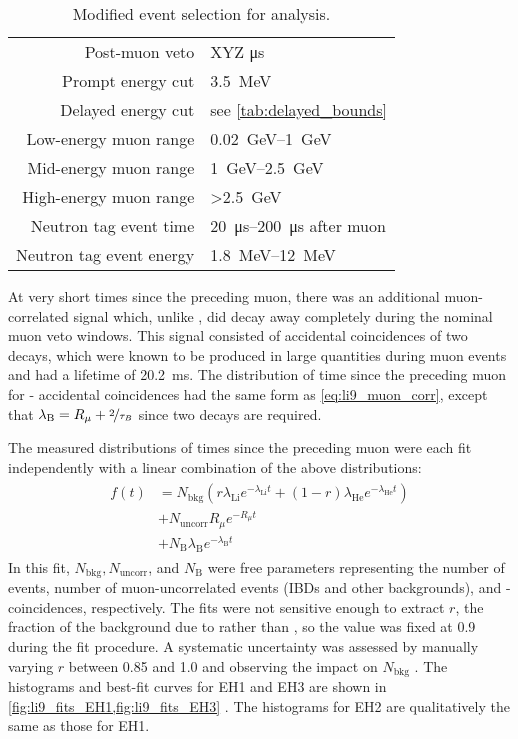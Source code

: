\begin{table}
    \centering
    \caption[\li{}/\he{} event selection]{Modified event selection for \li{} analysis.}
    \label{tab:li9}
    \begin{tabular}[t]{rl}
        \toprule
        Post-muon veto & XYZ \si{\us} \\
        Prompt energy cut & \SI{3.5}{\MeV} \\
        Delayed energy cut & see \cref{tab:delayed_bounds} \\
        Low-energy muon range & \SIrange{0.02}{1}{\GeV} \\
        Mid-energy muon range & \SIrange{1}{2.5}{\GeV} \\
        High-energy muon range & \SI{>2.5}{\GeV} \\
        Neutron tag event time & \SIrange{20}{200}{\us} after muon \\
        Neutron tag event energy & \SIrange{1.8}{12}{\MeV} \\
        \bottomrule
    \end{tabular}
\end{table}

At very short times since the preceding muon,
there was an additional muon-correlated signal
which, unlike \li{}, did decay away completely
during the nominal muon veto windows.
This signal consisted of accidental coincidences
of two \boron{} decays,
which were known to be produced in large quantities
during muon events \cite{kamland_li9}
and had a lifetime of \SI{20.2}{\ms}.
The distribution of time since the preceding muon
for \boron{}-\boron{} accidental coincidences
had the same form as \cref{eq:li9_muon_corr},
except that $\lambda_\text{B} = R_\mu + \nicefrac{2}{\tau_{B}}$
since two \boron{} decays are required.

The measured distributions of times since the preceding muon
were each fit independently with a linear combination of the above distributions:
\begin{align}\label{eq:li9_fit_fn}
    \begin{split}
        f(t) &= N_\text{bkg} (r \lambda_\text{Li} e^{-\lambda_\text{Li} t}
        + (1-r) \lambda_\text{He} e^{-\lambda_\text{He} t}) \\
             &+ N_\text{uncorr} R_\mu e^{-R_\mu t} \\
             &+ N_\text{B} \lambda_\text{B} e^{-\lambda_\text{B} t}
    \end{split}
\end{align}
In this fit, $N_\text{bkg}, N_\text{uncorr}$, and $N_\text{B}$
were free parameters representing the number of \li{} events,
number of muon-uncorrelated events (IBDs and other backgrounds),
and \boron{}-\boron{} coincidences, respectively.
The fits were not sensitive enough to extract $r$,
the fraction of the background due to \li{} rather than \he{},
so the value was fixed at 0.9 during the fit procedure.
A systematic uncertainty was assessed by manually varying $r$
between 0.85 and 1.0
and observing the impact on $N_\text{bkg}$ \cite{li9_details}.
The histograms and best-fit curves for EH1 and EH3 are shown
in \cref{fig:li9_fits_EH1,fig:li9_fits_EH3} \cite{jinjing_2020may}.
The histograms for EH2 are qualitatively the same as those for EH1.

